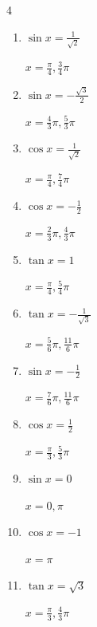 \begin{multicols}{4}
\begin{enumerate}
        $\displaystyle x = \frac{\pi}{2} , \frac{3}{2}\pi$

  \item $\displaystyle \sin{x}  = \frac{1}{\sqrt{2}}$

        $\displaystyle x = \frac{\pi}{4} , \frac{3}{4}\pi$

  \item $\displaystyle \sin{x}  = -\frac{\sqrt{3}}{2}$

        $\displaystyle x = \frac{4}{3}\pi , \frac{5}{3}\pi$

  \item $\displaystyle \cos{x}  = \frac{1}{\sqrt{2}}$

        $\displaystyle x = \frac{\pi}{4} , \frac{7}{4}\pi$

  \item $\displaystyle \cos{x}  = -\frac{1}{2}$

        $\displaystyle x = \frac{2}{3}\pi , \frac{4}{3}\pi$

  \item $\displaystyle \tan{x}  = 1$

        $\displaystyle x = \frac{\pi}{4} , \frac{5}{4}\pi$

  \item $\displaystyle \tan{x}  = -\frac{1}{\sqrt{3}}$

        $\displaystyle x = \frac{5}{6}\pi , \frac{11}{6}\pi$

\columnbreak %

  \item $\displaystyle \sin{x}  = -\frac{1}{2}$

        $\displaystyle x = \frac{7}{6}\pi , \frac{11}{6}\pi$

  \item $\displaystyle \cos{x}  = \frac{1}{2}$

        $\displaystyle x = \frac{\pi}{3} , \frac{5}{3}\pi$

  \item $\displaystyle \sin{x}  = 0$

        $\displaystyle x = 0 , \pi$

  \item $\displaystyle \cos{x}  = -1$

        $\displaystyle x = \pi$

  \item $\displaystyle \tan{x}  = \sqrt{3}$

        $\displaystyle x = \frac{\pi}{3} , \frac{4}{3}\pi$


\end{enumerate}
\end{multicols}

